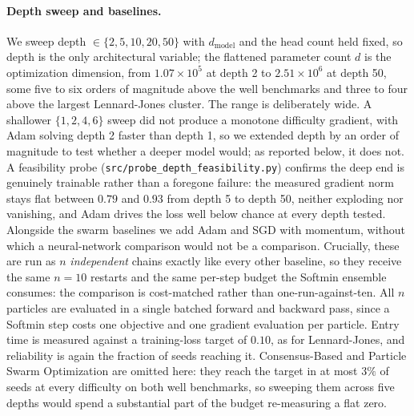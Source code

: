 \documentclass{article}
\theoremstyle{plain}
\theoremstyle{definition}
\theoremstyle{remark}
\begin{document}
\paragraph{Depth sweep and baselines.} We sweep depth $\in\{2,5,10,20,50\}$ with $d_{\text{model}}$ and the head count held fixed, so
depth is the only architectural variable; the flattened parameter count $d$ is the optimization
dimension, from $1.07\times10^5$ at depth 2 to $2.51\times10^6$ at depth 50, some five to six orders
of magnitude above the well benchmarks and three to four above the largest Lennard-Jones cluster. The range is
deliberately wide. A shallower $\{1,2,4,6\}$ sweep did not produce a monotone difficulty gradient,
with Adam solving depth 2 faster than depth 1, so we extended depth by an order of magnitude to
test whether a deeper model would; as reported below, it does not. A feasibility probe
(\texttt{src/probe\_depth\_feasibility.py}) confirms the deep end is genuinely trainable rather
than a foregone failure: the measured gradient norm stays flat between $0.79$ and $0.93$ from
depth 5 to depth 50, neither exploding nor vanishing, and Adam drives the loss well below chance
at every depth tested. Alongside the swarm baselines we add Adam \cite{kingma2014adam} and SGD
with momentum, without which a neural-network comparison would not be a comparison. Crucially,
these are run as $n$ \emph{independent} chains exactly like every other baseline, so they receive
the same $n=10$ restarts and the same per-step budget the Softmin ensemble consumes: the
comparison is cost-matched rather than one-run-against-ten. All $n$ particles are evaluated in a
single batched forward and backward pass, since a Softmin step costs one objective and one
gradient evaluation per particle. Entry time is measured against a training-loss target of
$0.10$, as for Lennard-Jones, and reliability is again the fraction of seeds reaching it. Consensus-Based and
Particle Swarm Optimization are omitted here: they reach the target in at most $3\%$ of seeds at every
difficulty on both well benchmarks, so sweeping them across five depths would spend a substantial part
of the budget re-measuring a flat zero.
\end{document}
